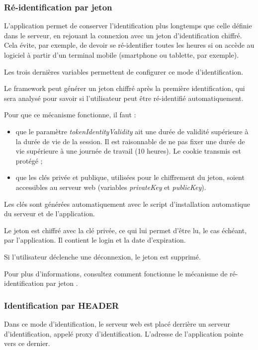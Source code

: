 \subsubsection{Ré-identification par jeton}

L'application permet de conserver l'identification plus longtemps que celle définie dans le serveur, en rejouant la connexion avec un jeton d'identification chiffré. Cela évite, par exemple, de devoir se ré-identifier toutes les heures si on accède au logiciel à partir d'un terminal mobile (smartphone ou tablette, par exemple).

Les trois dernières variables permettent de configurer ce mode d'identification. 

Le framework peut générer un jeton chiffré après la première identification, qui sera analysé pour savoir si l'utilisateur peut être ré-identifié automatiquement.

Pour que ce mécanisme fonctionne, il faut :
\begin{itemize}
\item que le paramètre \textit{tokenIdentityValidity} ait une durée de validité supérieure à la durée de vie de la session. Il est raisonnable de ne pas fixer une durée de vie supérieure à une journée de travail (10 heures). Le cookie transmis est protégé ;
\item que les clés privée et publique, utilisées pour le chiffrement du jeton, soient accessibles au serveur web (variables \textit{privateKey} et \textit{publicKey}).
\end{itemize}

Les clés sont générées automatiquement avec le script d'installation automatique du serveur et de l'application.

Le jeton est chiffré avec la clé privée, ce qui lui permet d'être lu, le cas échéant, par l'application. Il contient le login et la date d'expiration. 

Si l'utilisateur déclenche une déconnexion, le jeton est supprimé.

Pour plus d'informations, consultez comment fonctionne le mécanisme de ré-identification par jeton \cite{token}.

\subsubsection{Identification par HEADER}

Dans ce mode d'identification, le serveur web est placé derrière un serveur d'identification, appelé proxy d'identification. L'adresse de l'application pointe vers ce dernier. 


